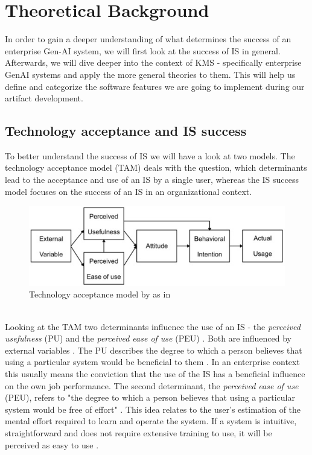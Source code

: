 \documentclass[
	english,
	ruledheaders=section,%
	class=report,%
	thesis={type=bachelor},%
	accentcolor=1b,%
	custommargins=true,%
	marginpar=false,%
	parskip=half-,%
	fontsize=11pt,%
	DIV=14,
]{tudapub}
\begin{document}
\chapter{Theoretical Background}
In order to gain a deeper understanding of what determines the success of an enterprise Gen-AI system, we will first look at the success of IS in general. Afterwards, we will dive deeper into the context of KMS - specifically enterprise GenAI systems and apply the more general theories to them. This will help us define and categorize the software features we are going to implement during our artifact development.
\section{Technology acceptance and IS success}
To better understand the success of IS we will have a look at two models. The technology acceptance model (TAM) \parencite{Davis1989} deals with the question, which determinants lead to the acceptance and use of an IS by a single user, whereas the IS success model \parencite{DeloneMcLean2003ISSuccessTenYearUpdate} focuses on the success of an IS in an organizational context.
\begin{figure}[h!]
    \includegraphics[width=1\linewidth]{images/TAM.png}
    \caption{Technology acceptance model by \parencite{Davis1989} as in \parencite[p.~1589]{Huimin}}
    \label{fig:enter-label}
\end{figure}
\\
Looking at the TAM two determinants influence the use of an IS - the \textit{perceived usefulness} (PU) and the \textit{perceived ease of use} (PEU) \parencite[p.~320]{Davis1989}. Both are influenced by external variables \parencite[p.~335]{Davis1989}. The PU describes the degree to which a person believes that using a particular system would be beneficial to them \parencite[p.~320]{Davis1989}. In an enterprise context this usually means the conviction that the use of the IS has a beneficial influence on the own job performance. The second determinant, the \textit{perceived ease of use} (PEU), refers to "the degree to which a person believes that using a particular system would be free of effort" \parencite[p.~320]{Davis1989}. This idea relates to the user's estimation of the mental effort required to learn and operate the system. If a system is intuitive, straightforward and does not require extensive training to use, it will be perceived as easy to use \parencite[p.~324-325]{Davis1989}.\\
\end{document}
